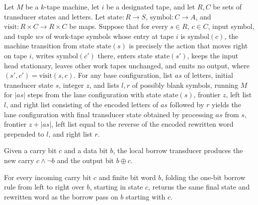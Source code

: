 \begin{lemma}
\label{Complexity.lane_run}
\leanok
{}
Let $M$ be a $k$-tape machine, let $i$ be a designated tape, and let $R,C$ be sets of
transducer states and letters. Let $\mathrm{state}:R\to S$, $\mathrm{symbol}:C\to A$,
and $\mathrm{visit}:R\times C\to R\times C$ be maps. Suppose that for every $s\in R$,
$c\in C$, input symbol, and tuple $ws$ of work-tape symbols whose entry at tape $i$ is
$\mathrm{symbol}(c)$, the machine transition from state $\mathrm{state}(s)$ is precisely
the action that moves right on tape $i$, writes $\mathrm{symbol}(c')$ there, enters
state $\mathrm{state}(s')$, keeps the input head stationary, leaves other work tapes
unchanged, and emits no output, where $(s',c')=\mathrm{visit}(s,c)$. For any base
configuration, list $as$ of letters, initial transducer state $s$, integer $z$, and
lists $l,r$ of possibly blank symbols, running $M$ for $|as|$ steps from the lane
configuration with state $\mathrm{state}(s)$, frontier $z$, left list $l$, and right
list consisting of the encoded letters of $as$ followed by $r$ yields the lane
configuration with final transducer state obtained by processing $as$ from $s$, frontier
$z+|as|$, left list equal to the reverse of the encoded rewritten word prepended to $l$,
and right list $r$.
\end{lemma}

\begin{definition}
\label{Complexity.budgetVisit}
\leanok
Given a carry bit $c$ and a data bit $b$, the local borrow transducer produces the new
carry $c \wedge \lnot b$ and the output bit $b \oplus c$.
\end{definition}

\begin{lemma}
\label{Complexity.budgetFold}
\leanok
{}
For every incoming carry bit $c$ and finite bit word $b$, folding the one-bit borrow
rule from left to right over $b$, starting in state $c$, returns the same final state
and rewritten word as the borrow pass on $b$ starting with $c$.
\end{lemma}


